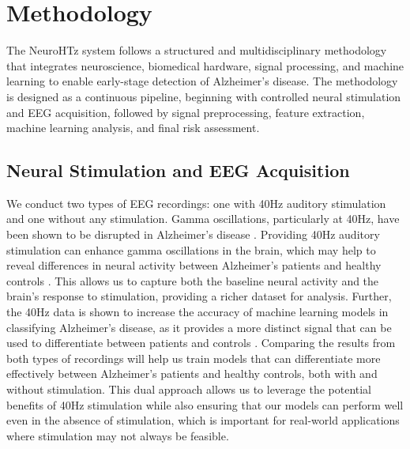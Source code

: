 \documentclass[openany]{book}
\begin{document}
\section{Methodology}
The NeuroHTz system follows a structured and multidisciplinary methodology that integrates neuroscience, biomedical hardware, signal processing, and machine learning to enable early-stage detection of Alzheimer's disease. The methodology is designed as a continuous pipeline, beginning with controlled neural stimulation and EEG acquisition, followed by signal preprocessing, feature extraction, machine learning analysis, and final risk assessment. \\
\subsection{Neural Stimulation and EEG Acquisition}
We conduct two types of EEG recordings: one with 40Hz auditory stimulation and one without any stimulation. Gamma oscillations, particularly at 40Hz, have been shown to be disrupted in Alzheimer's disease \cite{martorell2019gamma}. Providing 40Hz auditory stimulation can enhance gamma oscillations in the brain, which may help to reveal differences in neural activity between Alzheimer's patients and healthy controls \cite{iaccarino2016gamma}. This allows us to capture both the baseline neural activity and the brain's response to stimulation, providing a richer dataset for analysis. Further, the 40Hz data is shown to increase the accuracy of machine learning models in classifying Alzheimer's disease, as it provides a more distinct signal that can be used to differentiate between patients and controls \cite{acharya2018automated}. Comparing the results from both types of recordings will help us train models that can differentiate more effectively between Alzheimer's patients and healthy controls, both with and without stimulation. This dual approach allows us to leverage the potential benefits of 40Hz stimulation while also ensuring that our models can perform well even in the absence of stimulation, which is important for real-world applications where stimulation may not always be feasible. \\
\end{document}
